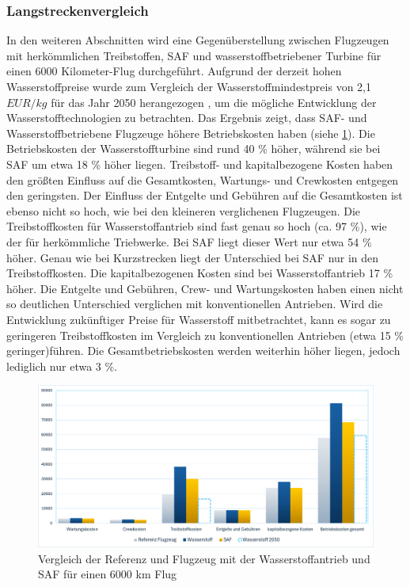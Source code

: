 \subsubsection{Langstreckenvergleich}
In den weiteren Abschnitten wird eine Gegenüberstellung zwischen Flugzeugen mit herkömmlichen Treibstoffen, 
SAF und wasserstoffbetriebener Turbine für einen 6000 Kilometer-Flug durchgeführt. %
Aufgrund der derzeit hohen Wasserstoffpreise wurde zum Vergleich der Wasserstoffmindestpreis 
von 2,1 $EUR/kg$ für das Jahr 2050 herangezogen \cite{hoelzen2022hydrogen}, 
um die mögliche Entwicklung der Wasserstofftechnologien zu betrachten.
%
Das Ergebnis zeigt, dass SAF- und Wasserstoffbetriebene Flugzeuge höhere Betriebskosten haben (siehe \ref{vergleichWA_Ref}).
Die Betriebskosten der Wasserstoffturbine sind rund 40 \% höher, während sie bei SAF um etwa 18 \% höher liegen.
Treibstoff- und kapitalbezogene Kosten haben den größten Einfluss auf die Gesamtkosten, 
Wartungs- und Crewkosten entgegen den geringsten.
Der Einfluss der Entgelte und Gebühren auf die Gesamtkosten ist ebenso nicht so hoch, 
wie bei den kleineren verglichenen Flugzeugen.
Die Treibstoffkosten für Wasserstoffantrieb sind fast genau so hoch (ca. 97 \%), wie der für herkömmliche Triebwerke. 
Bei SAF liegt dieser Wert nur etwa 54 \% höher. 
Genau wie bei Kurzstrecken liegt der Unterschied bei SAF nur in den Treibstoffkosten.
Die kapitalbezogenen Kosten sind bei Wasserstoffantrieb 17 \% höher.
Die Entgelte und Gebühren, Crew- und Wartungskosten haben einen nicht so 
deutlichen Unterschied verglichen mit konventionellen Antrieben. 
%
Wird die Entwicklung zukünftiger Preise für Wasserstoff mitbetrachtet, 
kann es sogar zu geringeren Treibstoffkosten im Vergleich zu konventionellen Antrieben (etwa 15 \% geringer)führen. 
Die Gesamtbetriebskosten werden weiterhin höher liegen, jedoch lediglich nur etwa 3 \%.

\begin{figure}[h]
	\centering
	\includegraphics[width=0.9\linewidth]{Bilder/VergleichWA_SAF.png}
	\caption[Betriebskosten]{Vergleich der Referenz und Flugzeug mit der Wasserstoffantrieb und SAF für einen 6000 km Flug}
	\label{vergleichWA_Ref}
\end{figure}

